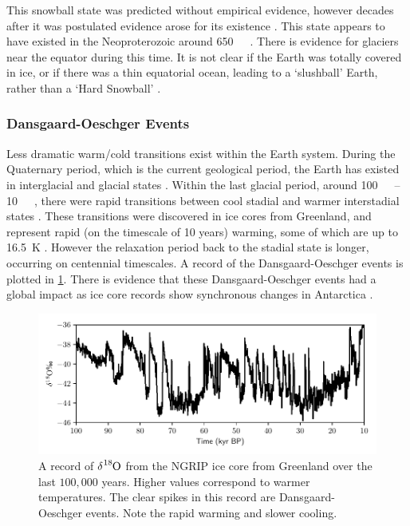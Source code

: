 This snowball state was predicted without empirical evidence, however decades after it was postulated evidence arose for its existence \parencite{Kirschvink1992,Hoffman2002}.
This state appears to have existed in the Neoproterozoic around \SI{650}{\mega\year\beforepresent}.
There is evidence for glaciers near the equator during this time. It is not clear
if the Earth was totally covered in ice, or if there was a thin equatorial ocean, leading to a `slushball' Earth, rather than a `Hard Snowball' \parencite{Pierrehumbert2005,Pierrehumbert2011}.

\subsubsection{Dansgaard-Oeschger Events}
Less dramatic warm/cold transitions exist within the Earth system. During the Quaternary period, which is the current geological period, the Earth has existed in
interglacial and glacial states \parencite{Lisiecki2005}. Within the last glacial period,
around \SIrange{100}{10}{\kilo\year\beforepresent}, there were rapid transitions between cool stadial and warmer interstadial states \parencite{Oeschger1984,Dansgaard1993}. These transitions were discovered
in ice cores from Greenland, and represent rapid (on the timescale of 10 years) warming, some of which are up to \SI{16.5}{\kelvin} \parencite{Kindler2014}. However the relaxation period
back to the stadial state is longer, occurring on centennial timescales. A record of the Dansgaard-Oeschger events is plotted in \cref{fig:ngrip}. There is evidence that these Dansgaard-Oeschger events
had a global impact as ice core records show synchronous changes in Antarctica \parencite{Buizert2015}.

\begin{figure}
  \centering
  \includegraphics[width=\textwidth,keepaspectratio]{ngrip}
  \caption[NGRIP record of Dansgaard Oeschger events]{A record of $\ce{\delta^{18}O}$ from the NGRIP ice core from Greenland \parencite{NGRIP2004} over the last $100,000$ years.
    Higher values correspond to warmer temperatures. The clear spikes in this record are Dansgaard-Oeschger events. Note the rapid warming and slower cooling.}
  \label{fig:ngrip}
\end{figure}

